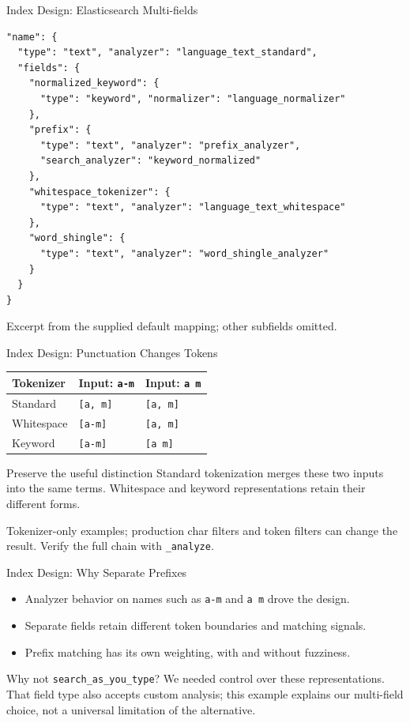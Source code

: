 \documentclass[aspectratio=169]{beamer}
\begin{document}
\begin{frame}[fragile]{Index Design: Elasticsearch Multi-fields}
  \scriptsize
\begin{verbatim}
"name": {
  "type": "text", "analyzer": "language_text_standard",
  "fields": {
    "normalized_keyword": {
      "type": "keyword", "normalizer": "language_normalizer"
    },
    "prefix": {
      "type": "text", "analyzer": "prefix_analyzer",
      "search_analyzer": "keyword_normalized"
    },
    "whitespace_tokenizer": {
      "type": "text", "analyzer": "language_text_whitespace"
    },
    "word_shingle": {
      "type": "text", "analyzer": "word_shingle_analyzer"
    }
  }
}
\end{verbatim}
  \small Excerpt from the supplied default mapping; other subfields omitted.
\end{frame}

\begin{frame}{Index Design: Punctuation Changes Tokens}
  \begin{center}
    \begin{tabular}{lll}
      \toprule
      Tokenizer & Input: \texttt{a-m} & Input: \texttt{a m} \\
      \midrule
      Standard & \texttt{[a, m]} & \texttt{[a, m]} \\
      Whitespace & \texttt{[a-m]} & \texttt{[a, m]} \\
      Keyword & \texttt{[a-m]} & \texttt{[a m]} \\
      \bottomrule
    \end{tabular}
  \end{center}
  \begin{block}{Preserve the useful distinction}
    Standard tokenization merges these two inputs into the same terms. Whitespace and keyword representations retain their different forms.
  \end{block}
  \small Tokenizer-only examples; production char filters and token filters can change the result. Verify the full chain with \texttt{\_analyze}.
\end{frame}

\begin{frame}{Index Design: Why Separate Prefixes}
  \begin{itemize}
    \item Analyzer behavior on names such as \texttt{a-m} and \texttt{a m} drove the design.
    \item Separate fields retain different token boundaries and matching signals.
    \item Prefix matching has its own weighting, with and without fuzziness.
  \end{itemize}
  \begin{block}{Why not \texttt{search\_as\_you\_type}?}
    We needed control over these representations. That field type also accepts custom analysis; this example explains our multi-field choice, not a universal limitation of the alternative.
  \end{block}
\end{frame}
\end{document}
